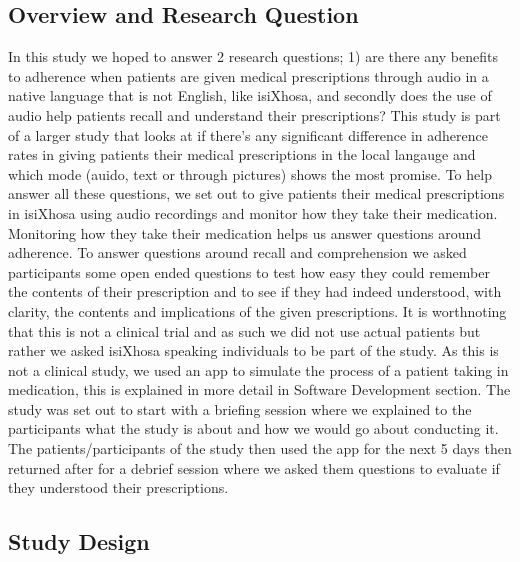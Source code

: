 \subsection{Overview and Research Question}
In this study we hoped to answer 2 research questions; 1) are there any benefits to adherence when patients are given medical prescriptions through audio in a native language that is not English, like isiXhosa, and secondly does the use of audio help patients recall and understand their prescriptions? This study is part of a larger study that looks at if there's any significant difference in adherence rates in giving patients their medical prescriptions in the local langauge and which mode (auido, text or through pictures) shows the most promise. To help answer all these questions, we set out to give patients their medical prescriptions in isiXhosa using audio recordings and monitor how they take their medication. Monitoring how they take their medication helps us answer questions around adherence. To answer questions around recall and comprehension we asked participants some open ended questions to test how easy they could remember the contents of their prescription and to see if they had indeed understood, with clarity, the contents and implications of the given prescriptions. It is worthnoting that this is not a clinical trial and as such we did not use actual patients but rather we asked isiXhosa speaking individuals to be part of the study. As this is not a clinical study, we used an app to simulate the process of a patient taking in medication, this is explained in more detail in Software Development section. The study was set out to start with a briefing session where we explained to the participants what the study is about and how we would go about conducting it. The patients/participants of the study then used the app for the next 5 days then returned after for a debrief session where we asked them questions to evaluate if they understood their prescriptions.

\subsection{Study Design}
